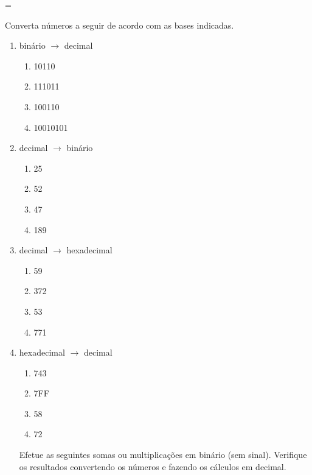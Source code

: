 \fi



\ifnum\exam=\provaum

 Converta números a seguir de acordo com as bases indicadas.

\begin{enumerate}[1]
\item binário $\rightarrow$ decimal
  \begin{enumerate}[(.1)]
  \item 10110
  \item 111011
  \item 100110
  \item 10010101
  \end{enumerate}
\item decimal $\rightarrow$ binário
  \begin{enumerate}[(.1)]
    \item 25
    \item 52
    \item 47
    \item 189
  \end{enumerate}
\item decimal $\rightarrow$ hexadecimal
    \begin{enumerate}[(.1)]
      \item 59
      \item 372
      \item 53
      \item 771
    \end{enumerate}
  \item hexadecimal $\rightarrow$ decimal
  \begin{enumerate}[(.1)]
    \item 743
    \item 7FF
    \item 58
    \item 72
  \end{enumerate}

 Efetue as seguintes somas ou multiplicações em binário (sem
sinal). Verifique os resultados convertendo os números e fazendo os
cálculos em decimal.


\end{enumerate}
